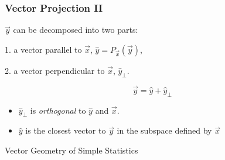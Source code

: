 \documentclass{beamer}
\begin{document}
\begin{frame}
  \frametitle{Vector Projection II}

$\vec{y}$ can be decomposed into two parts:

1. a vector parallel to $\vec{x}$, $\widehat{y} = P_{\vec{x}}(\vec{y})$, 

\smallskip

2. a vector perpendicular to $\vec{x}$, $\widehat{y}_{\bot}$.

\[
\vec{y} = \widehat{y} + \widehat{y}_{\bot}
\]

\begin{center}

\end{center}

\begin{itemize}
 \item $\widehat{y}_{\bot}$ is \emph{orthogonal} to $\widehat{y}$ and $\vec{x}$.
 \item $\widehat{y}$  is the closest vector to $\vec{y}$ in the subspace defined by $\vec{x}$
\end{itemize}

\end{frame}

\begin{frame}

\begin{center}
\LARGE{Vector Geometry of Simple Statistics}
\end{center}


\end{frame}
\end{document}

